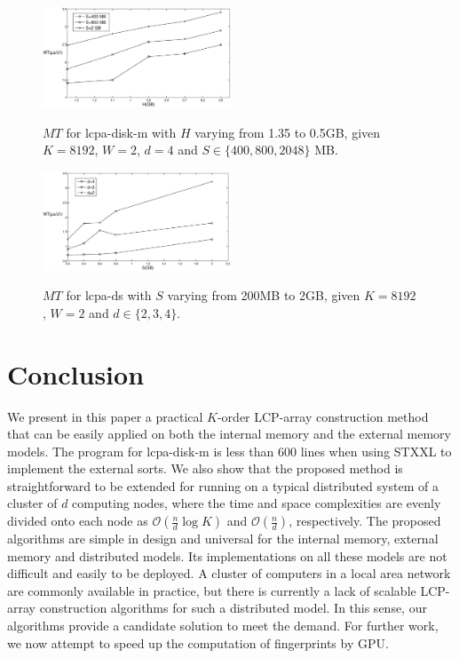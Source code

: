 \documentclass[10pt,journal,letterpaper,compsoc]{IEEEtran}
\begin{document}
\begin{CJK*}{GBK}{song}
\begin{figure}[hbtp!]
  \centering
  \includegraphics[width=0.5\textwidth]{stxxl_pq_impact.eps}\\
  \caption{$MT$ for lcpa-disk-m with $H$ varying from 1.35 to 0.5GB, given $K=8192$, $W=2$, $d=4$ and $S \in \{400, 800, 2048\}$ MB.}
  \label{fig:stxxl_pq_impact}
\end{figure}



\begin{figure}[hbtp!]
  \centering
  \includegraphics[width=0.5\textwidth]{ds_varying_n.eps}\\
  \caption{$MT$ for lcpa-ds with $S$ varying from 200MB to 2GB, given $K=8192$, $W=2$ and $d \in \{2,3,4\}$.}
  \label{fig:ds_varying_n}
\end{figure}


\section{Conclusion}\label{sec:conclusion}

We present in this paper a practical $K$-order LCP-array construction method that can be easily applied on both the internal memory and the external memory models. The program for lcpa-disk-m is less than 600 lines when using STXXL to implement the external sorts. We also show that the proposed method is straightforward to be extended for running on a typical distributed system of a cluster of $d$ computing nodes, where the time and space complexities are evenly divided onto each node as $\mathcal{O}(\frac{n}{d}\log K)$ and $\mathcal{O}(\frac{n}{d})$, respectively. The proposed algorithms are simple in design and universal for the internal memory, external memory and distributed models. Its implementations on all these models are not difficult and easily to be deployed.
A cluster of computers in a local area network are commonly available in practice, but there is currently a lack of scalable LCP-array construction algorithms for such a distributed model. In this sense, our algorithms provide a candidate solution to meet the demand. For further work, we now attempt to speed up the computation of fingerprints by GPU.


\end{CJK*}
\end{document}
